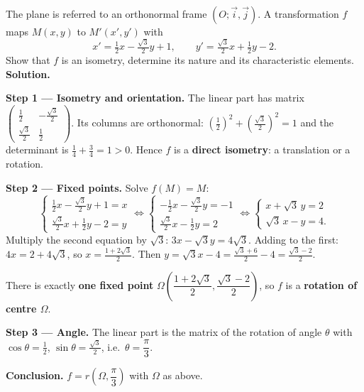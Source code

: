\documentclass[11pt]{article}
\begin{document}
\begin{exoresolu}
The plane is referred to an orthonormal frame $(O;\vec{i},\vec{j})$. A transformation $f$ maps $M(x,y)$ to $M'(x',y')$ with
\[ x' = \tfrac{1}{2}x - \tfrac{\sqrt{3}}{2}y + 1, \qquad y' = \tfrac{\sqrt{3}}{2}x + \tfrac{1}{2}y - 2. \]
Show that $f$ is an isometry, determine its nature and its characteristic elements.
\tcblower
\textbf{Solution.}

\textbf{Step 1 — Isometry and orientation.} The linear part has matrix $\begin{pmatrix} \frac12 & -\frac{\sqrt3}{2} \\[2pt] \frac{\sqrt3}{2} & \frac12 \end{pmatrix}$. Its columns are orthonormal: $\left(\frac12\right)^2 + \left(\frac{\sqrt3}{2}\right)^2 = 1$ and the determinant is $\frac14 + \frac34 = 1 > 0$. Hence $f$ is a \textbf{direct isometry}: a translation or a rotation.

\textbf{Step 2 — Fixed points.} Solve $f(M) = M$:
\[ \begin{cases} \frac12 x - \frac{\sqrt3}{2} y + 1 = x \\ \frac{\sqrt3}{2} x + \frac12 y - 2 = y \end{cases} \Longleftrightarrow \begin{cases} -\frac12 x - \frac{\sqrt3}{2} y = -1 \\ \frac{\sqrt3}{2} x - \frac12 y = 2 \end{cases} \Longleftrightarrow \begin{cases} x + \sqrt{3}\, y = 2 \\ \sqrt{3}\, x - y = 4. \end{cases} \]
Multiply the second equation by $\sqrt{3}$: $3x - \sqrt{3}y = 4\sqrt{3}$. Adding to the first: $4x = 2 + 4\sqrt{3}$, so $x = \frac{1 + 2\sqrt{3}}{2}$. Then $y = \sqrt{3}x - 4 = \frac{\sqrt{3} + 6}{2} - 4 = \frac{\sqrt{3} - 2}{2}$.

There is exactly \textbf{one fixed point} $\Omega\left(\dfrac{1+2\sqrt3}{2}, \dfrac{\sqrt3 - 2}{2}\right)$, so $f$ is a \textbf{rotation of centre $\Omega$}.

\textbf{Step 3 — Angle.} The linear part is the matrix of the rotation of angle $\theta$ with $\cos\theta = \frac12$, $\sin\theta = \frac{\sqrt3}{2}$, i.e.\ $\theta = \dfrac{\pi}{3}$.

\textbf{Conclusion.} $f = r\left(\Omega, \dfrac{\pi}{3}\right)$ with $\Omega$ as above.
\end{exoresolu}
\end{document}

